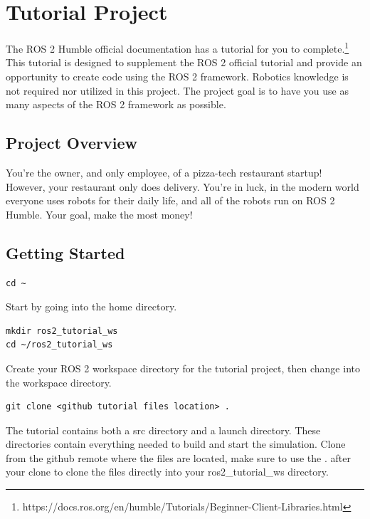 \documentclass[11pt]{article}
\begin{document}
\section{Tutorial Project}
The ROS 2 Humble official documentation has a tutorial for you to complete.\footnote{https://docs.ros.org/en/humble/Tutorials/Beginner-Client-Libraries.html} This tutorial is designed to supplement the ROS 2 official tutorial and provide an opportunity to create code using the ROS 2 framework. Robotics knowledge is not required nor utilized in this project. The project goal is to have you use as many aspects of the ROS 2 framework as possible.

\subsection{Project Overview}
You're the owner, and only employee, of a pizza-tech restaurant startup! However, your restaurant only does delivery. You're in luck, in the modern world everyone uses robots for their daily life, and all of the robots run on ROS 2 Humble. Your goal, make the most money!

\subsection{Getting Started}
\lstset{language=bash}
\begin{lstlisting}
cd ~	
\end{lstlisting}
Start by going into the home directory.\\
\begin{lstlisting}
mkdir ros2_tutorial_ws 
cd ~/ros2_tutorial_ws	
\end{lstlisting}
Create your ROS 2 workspace directory for the tutorial project, then change into the workspace directory.\\

\begin{lstlisting}
git clone <github tutorial files location> . 
\end{lstlisting}
The tutorial contains both a src directory and a launch directory. These directories contain everything needed to build and start the simulation. Clone from the github remote where the files are located, make sure to use the . after your clone to clone the files directly into your ros2\_tutorial\_ws directory.\\
\end{document}
